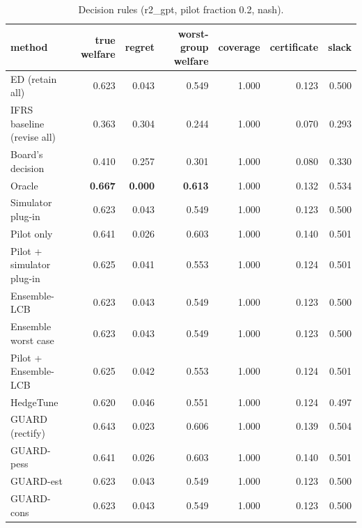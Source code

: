 \begin{table}[t]
\centering
\small
\begin{tabular}{lrrrrrr}
\toprule
method & true welfare & regret & worst-group welfare & coverage & certificate & slack \\
\midrule
ED (retain all) & 0.623 & 0.043 & 0.549 & 1.000 & 0.123 & 0.500 \\
IFRS baseline (revise all) & 0.363 & 0.304 & 0.244 & 1.000 & 0.070 & 0.293 \\
Board's decision & 0.410 & 0.257 & 0.301 & 1.000 & 0.080 & 0.330 \\
Oracle & \textbf{0.667} & \textbf{0.000} & \textbf{0.613} & 1.000 & 0.132 & 0.534 \\
Simulator plug-in & 0.623 & 0.043 & 0.549 & 1.000 & 0.123 & 0.500 \\
Pilot only & 0.641 & 0.026 & 0.603 & 1.000 & 0.140 & 0.501 \\
Pilot + simulator plug-in & 0.625 & 0.041 & 0.553 & 1.000 & 0.124 & 0.501 \\
Ensemble-LCB & 0.623 & 0.043 & 0.549 & 1.000 & 0.123 & 0.500 \\
Ensemble worst case & 0.623 & 0.043 & 0.549 & 1.000 & 0.123 & 0.500 \\
Pilot + Ensemble-LCB & 0.625 & 0.042 & 0.553 & 1.000 & 0.124 & 0.501 \\
HedgeTune & 0.620 & 0.046 & 0.551 & 1.000 & 0.124 & 0.497 \\
GUARD (rectify) & 0.643 & 0.023 & 0.606 & 1.000 & 0.139 & 0.504 \\
GUARD-pess & 0.641 & 0.026 & 0.603 & 1.000 & 0.140 & 0.501 \\
GUARD-est & 0.623 & 0.043 & 0.549 & 1.000 & 0.123 & 0.500 \\
GUARD-cons & 0.623 & 0.043 & 0.549 & 1.000 & 0.123 & 0.500 \\
\bottomrule
\end{tabular}
\caption{Decision rules (r2\_gpt, pilot fraction 0.2, nash).}
\label{tab:methods-nash}
\end{table}
